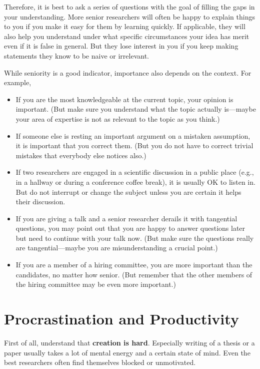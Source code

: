 \documentclass[12pt]{article}
\begin{document}
Therefore, it is best to ask a series of questions with the goal of filling the gaps in your understanding.
More senior researchers will often be happy to explain things to you if you make it easy for them by learning quickly.
If applicable, they will also help you understand under what specific circumstances your idea has merit even if it is false in general.
But they lose interest in you if you keep making statements they know to be naive or irrelevant.
\medskip

While seniority is a good indicator, importance also depends on the context.
For example,
\begin{itemize}
\item If you are the most knowledgeable at the current topic, your opinion is important.
(But make sure you understand what the topic actually is---maybe your area of expertise is not as relevant to the topic as you think.)
\item If someone else is resting an important argument on a mistaken assumption, it is important that you correct them.
(But you do not have to correct trivial mistakes that everybody else notices also.)
\item If two researchers are engaged in a scientific discussion in a public place (e.g., in a hallway or during a conference coffee break), it is usually OK to listen in.
But do not interrupt or change the subject unless you are certain it helps their discussion.
\item If you are giving a talk and a senior researcher derails it with tangential questions, you may point out that you are happy to answer questions later but need to continue with your talk now.
(But make sure the questions really are tangential---maybe you are misunderstanding a crucial point.)
\item If you are a member of a hiring committee, you are more important than the candidates, no matter how senior.
(But remember that the other members of the hiring committee may be even more important.)
\end{itemize}

\section{Procrastination and Productivity}

First of all, understand that \textbf{creation is hard}.
Especially writing of a thesis or a paper usually takes a lot of mental energy and a certain state of mind.
Even the best researchers often find themselves blocked or unmotivated.
\end{document}
